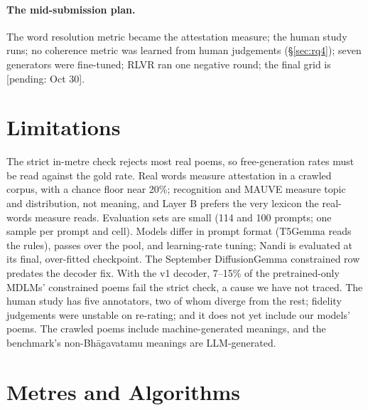 \documentclass[11pt]{article}
\newcommand{\pend}[1]{\textcolor{pend}{\textsf{\footnotesize[pending: #1]}}}
\begin{document}
\paragraph{The mid-submission plan.}\label{app:plan} The word resolution metric became the attestation measure;
the human study runs; no coherence metric was learned from human judgements (\S\ref{sec:rq4}); seven generators were
fine-tuned; RLVR ran one negative round; the final grid is \pend{Oct 30}.

\section*{Limitations}

The strict in-metre check rejects most real poems, so free-generation rates must be read against the gold
rate. Real words measure attestation in a crawled corpus, with a chance floor near 20\%; recognition and MAUVE
measure topic and distribution, not meaning, and Layer B prefers the very lexicon the real-words measure reads.
Evaluation sets are small (114 and 100 prompts; one sample per prompt and cell). Models differ in prompt format (T5Gemma reads the rules), passes over the pool, and
learning-rate tuning; Nandi is evaluated at its final, over-fitted checkpoint. The September DiffusionGemma
constrained row predates the decoder fix. With the v1 decoder, 7--15\% of the pretrained-only MDLMs' constrained
poems fail the strict check, a cause we have not traced. The human study has five annotators, two of whom diverge
from the rest; fidelity judgements were unstable on re-rating; and it does not yet include our models' poems. The crawled poems include
machine-generated meanings, and the benchmark's non-Bhāgavatamu meanings are LLM-generated.



\clearpage
\appendix

\section{Metres and Algorithms}\label{app:rules}
\end{document}
